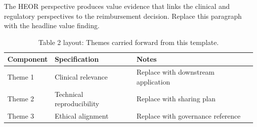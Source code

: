 
The HEOR perspective produces value evidence that links the clinical and regulatory perspectives to the reimbursement decision. Replace this paragraph with the headline value finding.

\begin{table}[H]
\caption{Table 2 layout: Themes carried forward from this template.}
\label{tab:conclusions_themes}
\centering
\begin{tabular}{>{\raggedright\arraybackslash}p{3.4cm} >{\raggedright\arraybackslash}p{4.6cm} >{\raggedright\arraybackslash}p{5.4cm}}
\toprule
\textbf{Component} & \textbf{Specification} & \textbf{Notes} \\
\midrule
  Theme 1 & Clinical relevance & Replace with downstream application \\
  Theme 2 & Technical reproducibility & Replace with sharing plan \\
  Theme 3 & Ethical alignment & Replace with governance reference \\
\bottomrule
\end{tabular}
\end{table}
